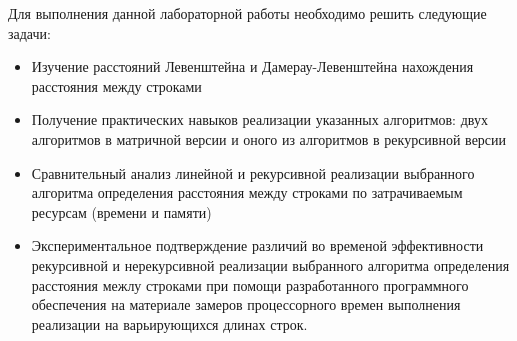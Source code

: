 \Introduction

Для выполнения данной лабораторной работы необходимо решить следующие задачи:

\begin{itemize}
 \item Изучение расстояний Левенштейна и Дамерау-Левенштейна нахождения расстояния между строками
 \item Получение практических навыков реализации указанных алгоритмов: двух алгоритмов
       в матричной версии и оного из алгоритмов в рекурсивной версии
 \item Сравнительный анализ линейной и рекурсивной реализации выбранного алгоритма
       определения расстояния между строками по затрачиваемым ресурсам (времени и памяти)
 \item Экспериментальное подтверждение различий во временой эффективности рекурсивной
       и нерекурсивной реализации выбранного алгоритма определения расстояния межлу
       строками при помощи разработанного программного обеспечения на материале замеров
       процессорного времен выполнения реализации на варьирующихся длинах строк.
\end{itemize}
